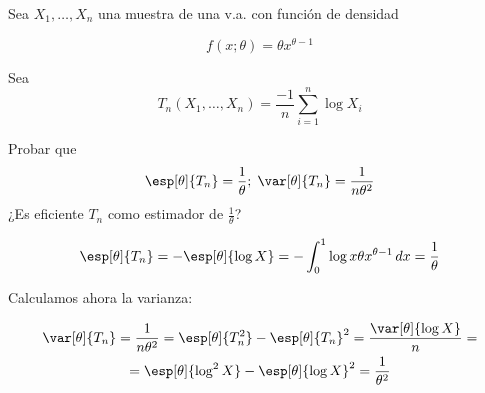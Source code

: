 \begin{problem}[9] Sea $X_1,\dotsc,X_n$ una muestra de una v.a. con función de densidad 

\[ f(x;\theta) = \theta x^{\theta - 1} \]

Sea  \[ T_n(X_1,\dotsc,X_n) = \frac{-1}{n}\sum_{i=1}^n\log X_i \]

\ppart Probar que \[\esp[\theta]{T_n} = \frac{1}{\theta};\; \var[\theta]{T_n} = \frac{1}{n\theta^2} \]
\ppart ¿Es eficiente $T_n$ como estimador de $\frac{1}{\theta}$?

\solution

\spart

\[ \esp[\theta]{T_n} = -\esp[\theta]{\log X} = - \int_0^1 \log x \theta x ^{\theta-1}\,dx = \frac{1}{\theta} \]

Calculamos ahora la varianza:

\begin{gather*}
\var[\theta]{T_n} = \frac{1}{n\theta^2} = \esp[\theta]{T_n^2} - \esp[\theta]{T_n}^2 = \frac{\var[\theta]{\log X}}{n} = \\
= \esp[\theta]{\log^2 X} - \esp[\theta]{\log X}^2 = \frac{1}{\theta^2}
\end{gather*}

\end{problem}


